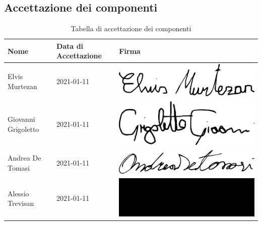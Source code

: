 \subsection{Accettazione dei componenti}
{
	\renewcommand{\arraystretch}{2}
	\begin{longtable}{ C{5cm} C{4cm} C{5cm} }
		\caption{Tabella di accettazione dei componenti}\\
		\rowcolor{\primaryColor}
		\textcolor{\secondaryColor}{\textbf{Nome}} & \textcolor{\secondaryColor}{\textbf{Data di Accettazione}} & \textcolor{\secondaryColor}{\textbf{Firma}}\\	\endhead
		{Elvis Murtezan} & 2021-01-11 & \includegraphics[scale=0.20]{./src/Organigramma/immagini/firme/Elvis.png}\\
		{Giovanni Grigoletto} & 2021-01-11 & \includegraphics[scale=0.20]{./src/Organigramma/immagini/firme/giovanni.png}\\
		{Andrea De Tomasi} & 2021-01-11 & \includegraphics[scale=0.20]{./src/Organigramma/immagini/firme/andrea.png}\\
		{Alessio Trevisan} & 2021-01-11 & \includegraphics[scale=0.20]{./src/Organigramma/immagini/firme/alessio.png}\\

\end{longtable}}
